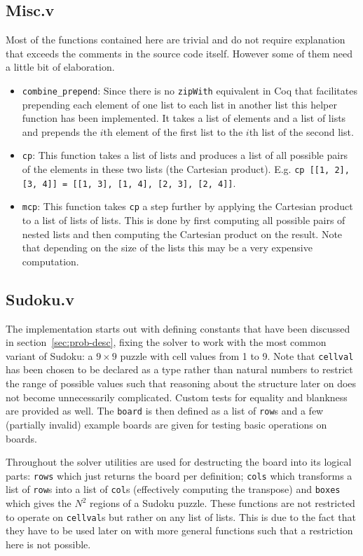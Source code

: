 \documentclass[a4paper,11pt]{article}
\begin{document}
\subsection{Misc.v}
Most of the functions contained here are trivial and do not require explanation that exceeds the comments in the source code itself. However some of them need a little bit of elaboration.
\begin{itemize}
  \item \texttt{combine\_prepend}: Since there is no \texttt{zipWith} equivalent in Coq that facilitates prepending each element of one list to each list in another list this helper function has been implemented. It takes a list of elements and a list of lists and prepends the \(i\)th element of the first list to the \(i\)th list of the second list.
  \item \texttt{cp}: This function takes a list of lists and produces a list of all possible pairs of the elements in these two lists (the Cartesian product). E.g. \texttt{cp [[1, 2], [3, 4]] = [[1, 3], [1, 4], [2, 3], [2, 4]]}.
  \item \texttt{mcp}: This function takes \texttt{cp} a step further by applying the Cartesian product to a list of lists of lists. This is done by first computing all possible pairs of nested lists and then computing the Cartesian product on the result. Note that depending on the size of the lists this may be a very expensive computation.
\end{itemize}

\subsection{Sudoku.v}
The implementation starts out with defining constants that have been discussed in section~\ref{sec:prob-desc}, fixing the solver to work with the most common variant of Sudoku: a \(9 \times 9\) puzzle with cell values from 1 to 9. Note that \texttt{cellval} has been chosen to be declared as a type rather than natural numbers to restrict the range of possible values such that reasoning about the structure later on does not become unnecessarily complicated. Custom tests for equality and blankness are provided as well. The \texttt{board} is then defined as a list of \texttt{row}s and a few (partially invalid) example boards are given for testing basic operations on boards.

Throughout the solver utilities are used for destructing the board into its logical parts: \texttt{rows} which just returns the board per definition; \texttt{cols} which transforms a list of \texttt{row}s into a list of \texttt{col}s (effectively computing the transpose) and \texttt{boxes} which gives the \(N^2\) regions of a Sudoku puzzle. These functions are not restricted to operate on \texttt{cellval}s but rather on any list of lists. This is due to the fact that they have to be used later on with more general functions such that a restriction here is not possible.
\end{document}
